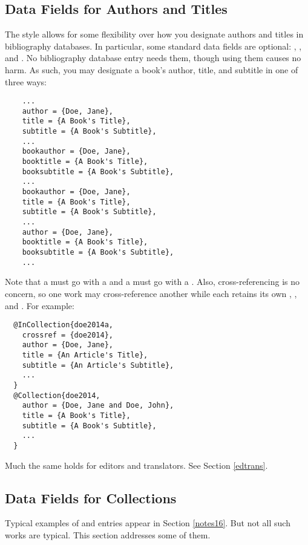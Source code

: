 \documentclass[11pt,letterpaper,oneside]{article}
\begin{document}
\subsection{Data Fields for Authors and Titles}
\label{authtitles}

The style allows for some flexibility over how you designate authors
and titles in bibliography databases. In particular, some standard
data fields are optional: , ,
and . No bibliography database entry needs
them, though using them causes no harm. As such, you may designate a
book's author, title, and subtitle in one of three ways:

\begin{lstlisting}
    ...
    author = {Doe, Jane},
    title = {A Book's Title},
    subtitle = {A Book's Subtitle},
    ...
    bookauthor = {Doe, Jane},
    booktitle = {A Book's Title},
    booksubtitle = {A Book's Subtitle},
    ...
    bookauthor = {Doe, Jane},
    title = {A Book's Title},
    subtitle = {A Book's Subtitle},
    ...
    author = {Doe, Jane},
    booktitle = {A Book's Title},
    booksubtitle = {A Book's Subtitle},
    ...
\end{lstlisting}

\noindent Note that a  must go with a
 and a  must go with a
. Also, cross-referencing is no concern, so one
work may cross-reference another while each retains its own
, , and . For
example:

\begin{lstlisting}
  @InCollection{doe2014a,
    crossref = {doe2014},
    author = {Doe, Jane},
    title = {An Article's Title},
    subtitle = {An Article's Subtitle},
    ...
  }
  @Collection{doe2014,
    author = {Doe, Jane and Doe, John},
    title = {A Book's Title},
    subtitle = {A Book's Subtitle},
    ...
  }
\end{lstlisting}

\noindent Much the same holds for editors and translators. See Section
\ref{edtrans}.

\subsection{Data Fields for Collections}
\label{collect}

Typical examples of  and 
entries appear in Section \ref{notes16}. But not all such works are
typical. This section addresses some of them.
\end{document}
